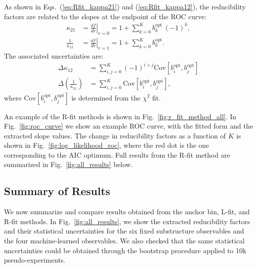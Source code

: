 \documentclass[aps,prd,twocolumn,preprintnumbers,nofootinbib,longbibliography,floatfix]{revtex4-1}
\DeclareRobustCommand{\Fig}[1]{Fig.~\ref{#1}}
\DeclareRobustCommand{\Eqs}[2]{Eqs.~(\ref{#1}) and (\ref{#2})}
\begin{document}
As shown in \Eqs{eq:Rfit_kappa21}{eq:Rfit_kappa12}, the reducibility factors are related to the slopes at the endpoint of the ROC curve:
%
\begin{align}
	\label{eq:kappa12_final_roc}
	\kappa_{21} &= \left. \frac{df}{dr}\right|_{r = 0}=1+\sum_{k=0}^{K}{b^{\text{opt}}_k\, (-1)^k},\\
	\label{eq:kappa21_final_roc}
	\frac{1}{\kappa_{12}} &= \left. \frac{df}{dr}\right|_{r = 1}=1+\sum_{k=0}^{K}b^{\text{opt}}_k.
\end{align}
%
The associated uncertainties are:
%
\begin{align}
	\label{eq:kappa12_final_roc_err}
	\Delta \kappa_{12} &= \sum_{i,j = 0}^K (-1)^{i+j} \text{Cov}[b^{\text{opt}}_i, b^{\text{opt}}_j]
	\\
	\label{eq:kappa21_final_roc_err}
	\Delta \left( \frac{1}{\kappa_{21}} \right) &= \sum_{i,j = 0}^{K} \text{Cov}[b^{\text{opt}}_i, b^{\text{opt}}_j],
\end{align}
%
where $\text{Cov}[b^{\text{opt}}_i, b^{\text{opt}}_j]$ is determined from the $\chi^2$ fit.



An example of the R-fit methods is shown in \Fig{fig:r_fit_method_all}.
%
In \Fig{fig:roc_curve} we show an example ROC curve, with the fitted form and the extracted slope values.
%
The change in reducibility factors as a function of $K$ is shown in \Fig{fig:log_likelihood_roc}, where the red dot is the one corresponding to the AIC optimum.
%
Full results from the R-fit method are summarized in \Fig{fig:all_results} below.


\subsection{Summary of Results}
\label{sec:summary}




We now summarize and compare results obtained from the anchor bin, L-fit, and R-fit methods.
%
In \Fig{fig:all_results}, we show the extracted reducibility factors and their statistical uncertainties for the six fixed substructure observables and the four machine-learned observables.
%
We also checked that the same statistical uncertainties could be obtained through the bootstrap procedure \cite{EfroTibs93} applied to 10k pseudo-experiments.
\end{document}
